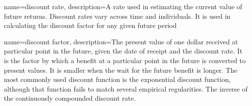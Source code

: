 {
name=discount rate,
description={A rate used in estimating the current value of future returns. Discount rates vary across time and individuals. It is used in calculating  the \gls{discount factor} for any given future period
} 
}




{
name=discount factor,
description={The present value of one dollar received at particular point in the future, given the date of receipt and the \gls{discount rate}. It is the  factor by which a benefit at a particular point in the future is converted to present values. It is smaller when the wait for the future benefit is longer.  The most commonly used discount function is the exponential discount function, although that function fails to match several empirical regularities. The inverse of the continuously compounded \gls{discount rate}. }
}


